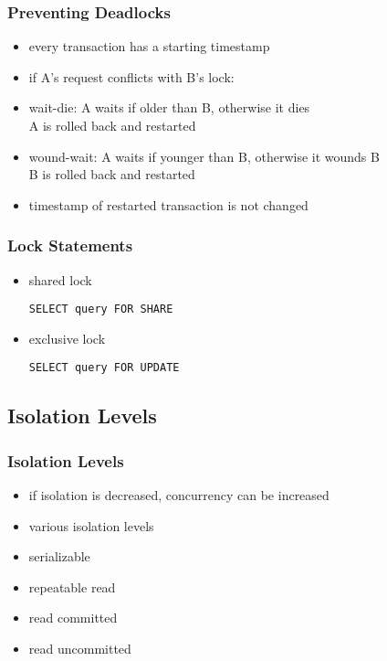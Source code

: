 \documentclass[dvipsnames]{beamer}
\theoremstyle{plain}
\begin{document}
\begin{frame}
  \frametitle{Preventing Deadlocks}

  \begin{itemize}
    \item every transaction has a starting timestamp

    \pause
    \item if A's request conflicts with B's lock:
    \medskip
    \item \alert{wait-die}: A waits if older than B, otherwise it dies\\
      A is rolled back and restarted

    \item \alert{wound-wait}: A waits if younger than B, otherwise it wounds B\\
      B is rolled back and restarted

    \pause
    \medskip
    \item timestamp of restarted transaction is not changed
  \end{itemize}
\end{frame}

\begin{frame}[fragile]
  \frametitle{Lock Statements}

  \begin{itemize}
    \item shared lock
    \begin{lstlisting}
SELECT query FOR SHARE
    \end{lstlisting}

    \item exclusive lock
    \begin{lstlisting}
SELECT query FOR UPDATE
    \end{lstlisting}
  \end{itemize}
\end{frame}

\subsection{Isolation Levels}

\begin{frame}
  \frametitle{Isolation Levels}

  \begin{itemize}
    \item if isolation is decreased, concurrency can be increased
    \item various isolation levels

    \medskip
    \item serializable
    \item repeatable read
    \item read committed
    \item read uncommitted
  \end{itemize}
\end{frame}
\end{document}
